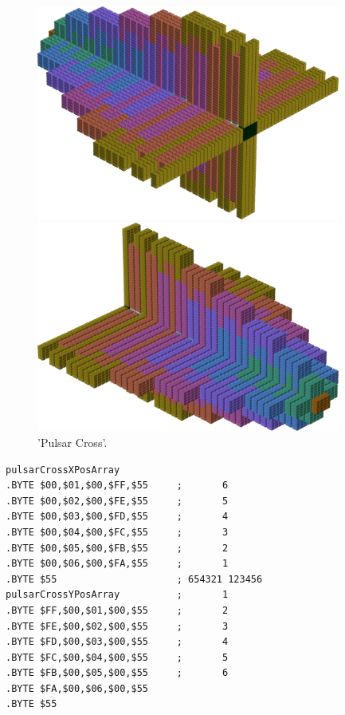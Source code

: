\begin{minipage}[b]{0.48\linewidth}
\vspace{0.5cm}
\begin{figure}[H]
    \centering
    \begin{adjustbox}{width=6cm,margin=0.5cm 0cm}
      \includegraphics[width=10cm]{src/colorspace_patterns/pattern4-45.png}%
    \end{adjustbox}
    \begin{adjustbox}{width=6cm,margin=0cm 0cm}
      \includegraphics[width=10cm]{src/colorspace_patterns/pattern4-225.png}%
    \end{adjustbox}
\caption{'Pulsar Cross'.}
\end{figure}
\end{minipage}
\begin{minipage}[b]{0.48\linewidth}
\vspace{0.5cm}
\begin{lrbox}{\mybox}%
\hspace{1.5cm}
\begin{lstlisting}[basicstyle=\ttfamily\tiny,escapechar=\%]
pulsarCrossXPosArray
.BYTE $00,$01,$00,$FF,$55     ;       6      
.BYTE $00,$02,$00,$FE,$55     ;       5      
.BYTE $00,$03,$00,$FD,$55     ;       4      
.BYTE $00,$04,$00,$FC,$55     ;       3      
.BYTE $00,$05,$00,$FB,$55     ;       2      
.BYTE $00,$06,$00,$FA,$55     ;       1      
.BYTE $55                     ; 654321 123456
pulsarCrossYPosArray          ;       1      
.BYTE $FF,$00,$01,$00,$55     ;       2      
.BYTE $FE,$00,$02,$00,$55     ;       3      
.BYTE $FD,$00,$03,$00,$55     ;       4      
.BYTE $FC,$00,$04,$00,$55     ;       5      
.BYTE $FB,$00,$05,$00,$55     ;       6      
.BYTE $FA,$00,$06,$00,$55
.BYTE $55
\end{lstlisting}
\end{lrbox}%
\scalebox{0.8}{\usebox{\mybox}}

\end{minipage}
